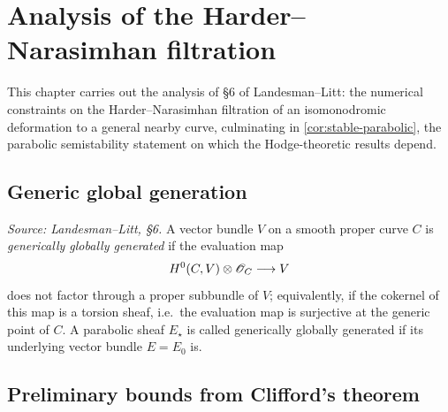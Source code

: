 \chapter{Analysis of the Harder--Narasimhan filtration}
\label{chap:hn}


This chapter carries out the analysis of \S6 of Landesman--Litt: the numerical
constraints on the Harder--Narasimhan filtration of an isomonodromic deformation
to a general nearby curve, culminating in \cref{cor:stable-parabolic}, the
parabolic semistability statement on which the Hodge-theoretic results depend.

\section{Generic global generation}

\begin{definition}
  \label{def:generic-global-generation}
  \textit{Source: Landesman--Litt, \S6.}
  A vector bundle $V$ on a smooth proper curve $C$ is \emph{generically globally
  generated} if the evaluation map
  \[
    H^0(C, V) \otimes \mathscr{O}_C \longrightarrow V
  \]
  does not factor through a proper subbundle of $V$; equivalently, if the cokernel
  of this map is a torsion sheaf, i.e.\ the evaluation map is surjective at the
  generic point of $C$. A parabolic sheaf $E_\star$ is called generically globally
  generated if its underlying vector bundle $E = E_0$ is.
\end{definition}

\section{Preliminary bounds from Clifford's theorem}

